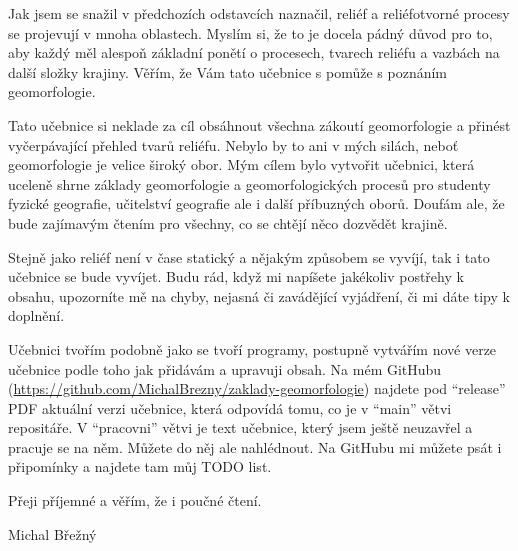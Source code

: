 Jak jsem se snažil v předchozích odstavcích naznačil, reliéf a reliéfotvorné procesy se projevují v mnoha oblastech. Myslím si, že to je docela pádný důvod pro to, aby každý měl alespoň základní ponětí o procesech, tvarech reliéfu a vazbách na další složky krajiny. Věřím, že Vám tato učebnice s pomůže s poznáním geomorfologie. 

\newpage
Tato učebnice si neklade za cíl obsáhnout všechna zákoutí geomorfologie a přinést vyčerpávající přehled tvarů reliéfu. Nebylo by to ani v mých silách, neboť geomorfologie je velice široký obor. Mým cílem bylo vytvořit učebnici, která uceleně shrne základy geomorfologie a geomorfologických procesů pro studenty fyzické geografie, učitelství geografie ale i další příbuzných oborů. Doufám ale, že bude zajímavým čtením pro všechny, co se chtějí něco dozvědět krajině. 

Stejně jako reliéf není v čase statický a nějakým způsobem se vyvíjí, tak i tato učebnice se bude vyvíjet. Budu rád, když mi napíšete jakékoliv postřehy k obsahu, upozorníte mě na chyby, nejasná či zavádějící vyjádření, či mi dáte tipy k doplnění.

Učebnici tvořím podobně jako se tvoří programy, postupně vytvářím nové verze učebnice podle toho jak přidávám a upravuji obsah. Na mém GitHubu (\url{https://github.com/MichalBrezny/zaklady-geomorfologie}) najdete pod \enquote{release} PDF aktuální verzi učebnice, která odpovídá tomu, co je v \enquote{main} větvi repositáře. V \enquote{pracovni} větvi je text učebnice, který jsem ještě neuzavřel a pracuje se na něm. Můžete do něj ale nahlédnout. Na GitHubu mi můžete psát i připomínky a najdete tam můj TODO list. 

\vspace{2cm}
Přeji příjemné a věřím, že i poučné čtení.
\begin{flushright}
	Michal Břežný
\end{flushright}

 
%
%
